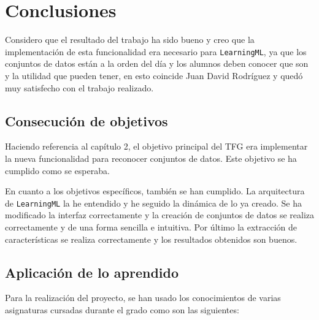 \documentclass[a4paper, 12pt]{book}
\begin{document}
\cleardoublepage
\chapter{Conclusiones}
\label{chap:conclusiones}

Considero que el resultado del trabajo ha sido bueno y creo que la implementación de esta funcionalidad era necesario para \texttt{LearningML}, ya que los conjuntos de datos están a la orden del día y los alumnos deben conocer que son y la utilidad que pueden tener, en esto coincide Juan David Rodríguez y quedó muy satisfecho con el trabajo realizado.


\section{Consecución de objetivos}
\label{sec:consecucion-objetivos}

Haciendo referencia al capítulo 2, el objetivo principal del TFG era implementar la nueva funcionalidad para reconocer conjuntos de datos. Este objetivo se ha cumplido como se esperaba.

En cuanto a los objetivos específicos, también se han cumplido. La arquitectura de \texttt{LearningML} la he entendido y he seguido la dinámica de lo ya creado. Se ha modificado la interfaz correctamente y la creación de conjuntos de datos se realiza correctamente y de una forma sencilla e intuitiva. Por último la extracción de características se realiza correctamente y los resultados obtenidos son buenos.

\section{Aplicación de lo aprendido}
\label{sec:aplicacion}

Para la realización del proyecto, se han usado los conocimientos de varias asignaturas cursadas durante el grado como son las siguientes:
\end{document}
